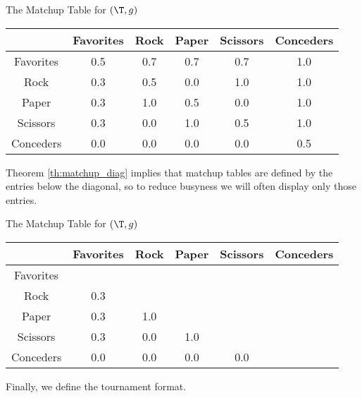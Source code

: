 {    \begin{figg}{The Matchup Table for $(\T, g)$}{}
        \begin{center}
            \begin{tabular}{ c | c c c c c}
            & Favorites & Rock & Paper & Scissors & Conceders\\
            \hline
            Favorites & 0.5 & 0.7 & 0.7 & 0.7 & 1.0\\
            Rock      & 0.3 & 0.5 & 0.0 & 1.0 & 1.0\\
            Paper     & 0.3 & 1.0 & 0.5 & 0.0 & 1.0\\
            Scissors  & 0.3 & 0.0 & 1.0 & 0.5 & 1.0\\
            Conceders & 0.0 & 0.0 & 0.0 & 0.0 & 0.5
            \end{tabular}
        \end{center}
    \end{figg}
    
    
    Theorem \ref{th:matchup_diag} implies that matchup tables are defined by the entries below the diagonal, so to reduce busyness we will often display only those entries.

    \begin{figg}{The Matchup Table for $(\T, g)$}{}
        \begin{center}
            \begin{tabular}{ c | c c c c c}
            & Favorites & Rock & Paper & Scissors & Conceders\\
            \hline
            Favorites & &  &  &  & \\
            Rock      & 0.3 & & &  & \\
            Paper     & 0.3 & 1.0 & & & \\
            Scissors  & 0.3 & 0.0 & 1.0 & & \\
            Conceders & 0.0 & 0.0 & 0.0 & 0.0 &
            \end{tabular}
        \end{center}
    \end{figg}

    Finally, we define the tournament format.


}

